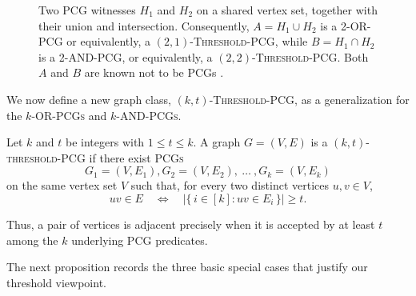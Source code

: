 \documentclass[a4paper,UKenglish,cleveref,autoref,thm-restate]{socg-lipics-v2021}
\begin{document}
\begin{figure}[t]
{%
}
\caption{Two \textsc{PCG} witnesses $H_1$ and $H_2$ on a shared vertex set, together with their union and intersection. Consequently, $A=H_1\cup H_2$ is a \textsc{2-OR-PCG} or equivalently, a \textsc{$(2,1)$-Threshold-\textsc{PCG}}, while $B=H_1\cap H_2$ is a \textsc{2-AND-PCG}, or equivalently, a \textsc{$(2,2)$-Threshold-\textsc{PCG}}. Both $A$ and $B$ are known not to be PCGs \cite{Azam2020AMFAN,Calamoneri2022AllGWAA}.}
\label{fig:prelim-pcg-or-and}
\end{figure}

We now define a new graph class, \textsc{$(k,t)$-Threshold-\textsc{PCG}}, as a generalization for the \textsc{$k$-\textsc{OR}-\textsc{PCGs}} and \textsc{$k$-\textsc{AND}-\textsc{PCGs}}.

\begin{definition}
Let $k$ and $t$ be integers with $1\le t\le k$. A graph $G=(V,E)$ is a \textsc{$(k,t)$-threshold-\textsc{PCG}} if there exist \textsc{PCGs}
\[
G_1=(V,E_1),G_2=(V,E_2),\ \dots\ ,G_k=(V,E_k)
\]
on the same vertex set $V$ such that, for every two distinct vertices $u,v\in V$,
\[
uv\in E
\quad\Longleftrightarrow\quad
\bigl|\{\,i\in[k]: uv\in E_i\,\}\bigr|\ge t.
\]
\end{definition}

Thus, a pair of vertices is adjacent precisely when it is accepted by at least $t$ among the $k$ underlying \textsc{PCG} predicates.

The next proposition records the three basic special cases that justify our threshold viewpoint.
\end{document}
